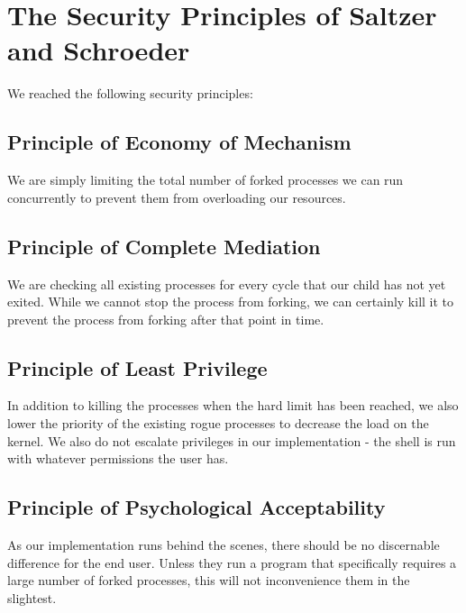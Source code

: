 \documentclass{article}
\begin{document}


\section{The Security Principles of Saltzer and Schroeder}
We reached the following security principles: \\ 
\subsection{Principle of Economy of Mechanism}
We are simply limiting the total number of forked processes we can run
concurrently to prevent them from overloading our resources.
\subsection{Principle of Complete Mediation}
We are checking all existing processes for every cycle that our child has not
yet exited. While we cannot stop the process from forking, we can certainly
kill it to prevent the process from forking after that point in time.
\subsection{Principle of Least Privilege}
In addition to killing the processes when the hard limit has been reached, we
also lower the priority of the existing rogue processes to decrease the load on
the kernel. We also do not escalate privileges in our implementation - the 
shell is run with whatever permissions the user has.
\subsection{Principle of Psychological Acceptability}
As our implementation runs behind the scenes, there should be no discernable
difference for the end user. Unless they run a program that specifically 
requires a large number of forked processes, this will not inconvenience them 
in the slightest. \\ 
\end{document}
